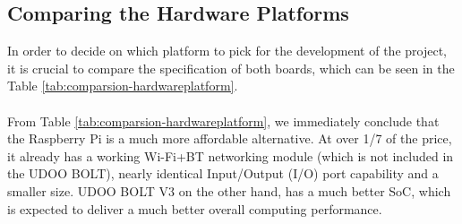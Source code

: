 \subsection{Comparing the Hardware Platforms}

In order to decide on which platform to pick for the development of the project, it is crucial to compare the specification of both boards, which can be seen in the Table \ref{tab:comparsion-hardwareplatform}.

\paragraph{} From Table \ref{tab:comparsion-hardwareplatform}, we immediately conclude that the Raspberry Pi is a much more affordable alternative. At over 1/7 of the price, it already has a working Wi-Fi+BT networking module (which is not included in the UDOO BOLT), nearly identical Input/Output (I/O) port capability and a smaller size. UDOO BOLT V3 on the other hand, has a much better SoC, which is expected to deliver a much better overall computing performance.

